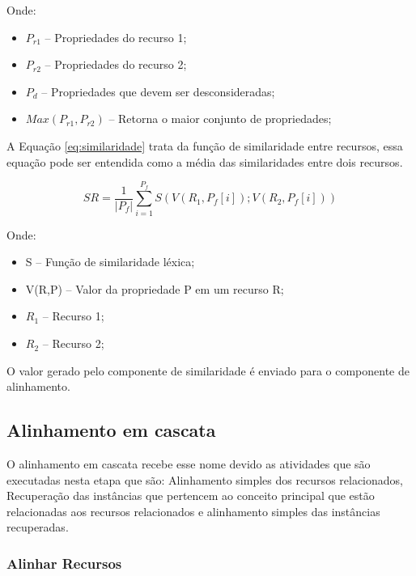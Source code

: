 Onde:
\begin{itemize}
	\item $P_{r1}$ – Propriedades do recurso 1;
	\item $P_{r2}$ –  Propriedades do recurso 2;
	\item $P_d$ –  Propriedades que devem ser desconsideradas;
	\item $M a x  ( P_{r1} ,P_{r2} )$ – Retorna o maior conjunto de propriedades;
\end{itemize}

A Equação \ref{eq:similaridade} trata da função de similaridade entre recursos, essa equação pode ser entendida como a média das similaridades entre dois recursos.

\begin{equation}
SR  = \frac{1}{|P_f|} { \sum_{i = 1}^{P_f} {S(V(R_1,P_f[i]);V(R_2,P_f[i]))}}
\label{eq:similaridade}
\end{equation}

Onde:

\begin{itemize}
	\item S – Função de similaridade léxica;
	\item V(R,P) – Valor da propriedade P em um recurso R;
	\item $R_1$ – Recurso 1;
	\item $R_2$ – Recurso 2;
\end{itemize}

O valor gerado pelo componente de similaridade é enviado para o componente de alinhamento.

\subsection{Alinhamento em cascata}
\label{sub:cascata}
O alinhamento em cascata recebe esse nome devido as atividades que são executadas nesta etapa que são: Alinhamento simples dos recursos relacionados, Recuperação das instâncias que pertencem ao conceito principal que estão relacionadas aos recursos relacionados e alinhamento simples das instâncias recuperadas.


\subsubsection{Alinhar Recursos}

